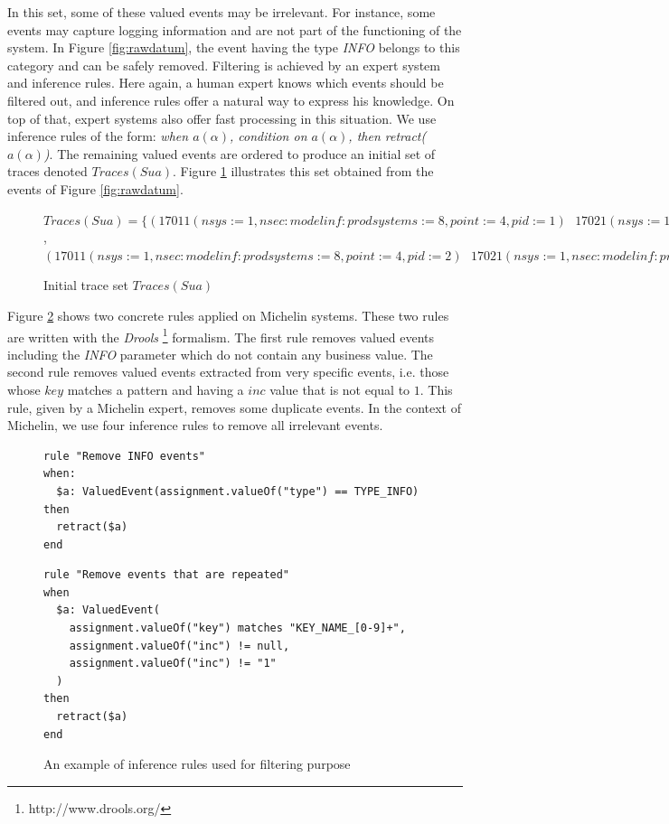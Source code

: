 In this set, some of these valued events may be irrelevant.  For
instance, some events may capture logging information and are not
part of the functioning of the system. In Figure
\ref{fig:rawdatum}, the event having the type \textit{INFO}
belongs to this category and can be safely removed. Filtering is
achieved by an expert system and inference rules. Here again, a
human expert knows which events should be filtered out, and
inference rules offer a natural way to express his knowledge. On
top of that, expert systems also offer fast processing in this
situation. We use inference rules of the form: \textit{when
$a(\alpha)$, condition on $a(\alpha)$, then
retract($a(\alpha)$)}.
The remaining valued events are ordered to produce an initial set
of traces denoted $Traces(Sua)$. Figure \ref{fig:tsua}
illustrates this set obtained from the events of Figure
\ref{fig:rawdatum}.

\begin{figure}[ht]
\begin{framed}
    $Traces(Sua) = \{
    (17011(nsys:=1,nsec:modelinf:prodsystems:=8,point:=4,pid:=1)\text{ }
    17021(nsys:=1,nsec:modelinf:prodsystems:=8,point:=4,tpoint:=8,pid:=1))$,
    $(17011(nsys:=1,nsec:modelinf:prodsystems:=8,point:=4,pid:=2)\text{ }
    17021(nsys:=1,nsec:modelinf:prodsystems:=8,point:=4,tpoint:=8,pid:=2)) \}$
\end{framed}

\caption{Initial trace set $Traces(Sua)$}
\label{fig:tsua}
\end{figure}

Figure \ref{fig:removalrules} shows two concrete rules applied on
Michelin systems. These two rules are written with the
\textit{Drools} \footnote{http://www.drools.org/} formalism.
The first rule removes valued events including the \textit{INFO}
parameter which do not contain any business value. The second
rule removes valued events extracted from very specific events,
i.e. those whose $key$ matches a pattern and having a $inc$ value
that is not equal to $1$. This rule, given by a Michelin expert,
removes some duplicate events. In the context of Michelin, we
use four inference rules to remove all irrelevant events.

\begin{figure}[ht]
\begin{framed}
\begin{BVerbatim}
rule "Remove INFO events"
when:
  $a: ValuedEvent(assignment.valueOf("type") == TYPE_INFO)
then
  retract($a)
end
\end{BVerbatim}
\end{framed}

\begin{framed}
\begin{BVerbatim}
rule "Remove events that are repeated"
when
  $a: ValuedEvent(
    assignment.valueOf("key") matches "KEY_NAME_[0-9]+",
    assignment.valueOf("inc") != null,
    assignment.valueOf("inc") != "1"
  )
then
  retract($a)
end
\end{BVerbatim}
\end{framed}

\caption{An example of inference rules used for filtering purpose}
\label{fig:removalrules}
\end{figure}

